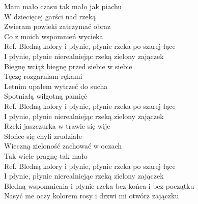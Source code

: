 
\begin{flushleft}
Mam mało czasu tak mało jak piachu  \tab{} \\
W dziecięcej garści nad rzeką  \tab{}\tab{} \\
Zwieram powieki zatrzymać obraz  \tab{} \\
Co z moich wspomnień wycieka  \tab{} \\
\vskip 3mm
Ref. Bledną kolory i płynie, płynie rzeka po szarej łące  \\
\hspace{0.9cm}I płynie, płynie nierealniejąc rzeką zielony zajączek  \\
\vskip 3mm
Biegnę wciąż biegnę przed siebie w siebie \\
Tęczę rozgarniam rękami \\
Letnim upałem wytrzeć do sucha \\
Spotniałą wilgotną pamięć \\
\vskip 3mm
Ref. Bledną kolory i płynie, płynie rzeka po szarej łące\\
\hspace{0.9cm}I płynie, płynie nierealniejąc rzeką zielony zajączek \\
\vskip 3mm
Rzeki jaszczurka w trawie się wije \\
Słońce się chyli zrudziałe \\
Wieczną zieloność zachować w oczach \\
Tak wiele pragnę tak mało \\
\vskip 3mm
Ref. Bledną kolory i płynie, płynie rzeka po szarej łące\\
\hspace{0.9cm}I płynie, płynie nierealniejąc rzeką zielony zajączek \\
\vskip 3mm
\hspace{0.9cm}Bledną wspomnienia i płynie rzeka bez końca i bez początku \\
\hspace{0.9cm}Nasyć me oczy kolorem rosy i drzwi mi otwórz zajączku \\
\end{flushleft}
\clearpage
